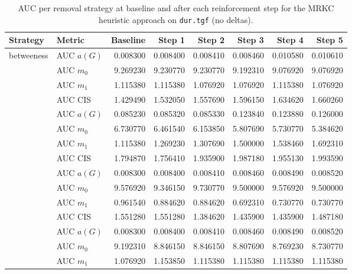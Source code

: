 
\begin{table}[htbp]
  \centering
  \caption{AUC per removal strategy at baseline and after each reinforcement step for the MRKC heuristic approach on \texttt{dur.tgf} (no deltas).}
  \label{tab:dur-mrkc_heuristic-auc}
  \begin{tabular}{llrrrrrr}
    \toprule
    \textbf{Strategy} & \textbf{Metric} & \textbf{Baseline} & \textbf{Step 1} & \textbf{Step 2} & \textbf{Step 3} & \textbf{Step 4} & \textbf{Step 5} \\
    \midrule
    \multirow{4}{*}{betweeness} & AUC $a(G)$ & 0.008300 & 0.008400 & 0.008410 & 0.008460 & 0.010580 & 0.010610 \\
    & AUC $m_0$ & 9.269230 & 9.230770 & 9.230770 & 9.192310 & 9.076920 & 9.076920 \\
    & AUC $m_1$ & 1.115380 & 1.115380 & 1.076920 & 1.076920 & 1.115380 & 1.076920 \\
    & AUC CIS & 1.429490 & 1.532050 & 1.557690 & 1.596150 & 1.634620 & 1.660260 \\
    \addlinespace
    \multirow{4}{*}{closeness} & AUC $a(G)$ & 0.085230 & 0.085320 & 0.085330 & 0.123840 & 0.123880 & 0.126000 \\
    & AUC $m_0$ & 6.730770 & 6.461540 & 6.153850 & 5.807690 & 5.730770 & 5.384620 \\
    & AUC $m_1$ & 1.115380 & 1.269230 & 1.307690 & 1.500000 & 1.538460 & 1.692310 \\
    & AUC CIS & 1.794870 & 1.756410 & 1.935900 & 1.987180 & 1.955130 & 1.993590 \\
    \addlinespace
    \multirow{4}{*}{core influence} & AUC $a(G)$ & 0.008300 & 0.008400 & 0.008410 & 0.008460 & 0.008490 & 0.008520 \\
    & AUC $m_0$ & 9.576920 & 9.346150 & 9.730770 & 9.500000 & 9.576920 & 9.500000 \\
    & AUC $m_1$ & 0.961540 & 0.884620 & 0.884620 & 0.692310 & 0.730770 & 0.730770 \\
    & AUC CIS & 1.551280 & 1.551280 & 1.384620 & 1.435900 & 1.435900 & 1.487180 \\
    \addlinespace
    \multirow{4}{*}{degree} & AUC $a(G)$ & 0.008300 & 0.008400 & 0.008410 & 0.008460 & 0.008490 & 0.008520 \\
    & AUC $m_0$ & 9.192310 & 8.846150 & 8.846150 & 8.807690 & 8.769230 & 8.730770 \\
    & AUC $m_1$ & 1.076920 & 1.153850 & 1.115380 & 1.115380 & 1.115380 & 1.115380 \\

\end{tabular}
\end{table}
